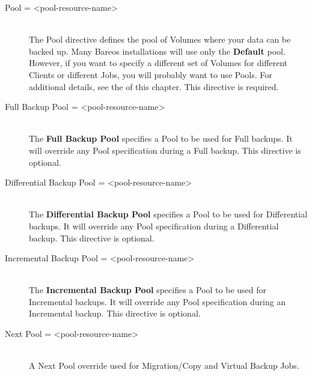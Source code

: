 \begin{description}
\item [Pool = {\textless}pool-resource-name{\textgreater}] \hfill \\
The Pool directive defines the pool of Volumes where your data can be
backed up.  Many Bareos installations will use only the {\bf Default}
pool.  However, if you want to specify a different set of Volumes for
different Clients or different Jobs, you will probably want to use
Pools.  For additional details, see the  of this chapter.  This directive is required.

\item [Full Backup Pool = {\textless}pool-resource-name{\textgreater}] \hfill \\
The {\bf Full Backup Pool} specifies a Pool to be used for Full backups.
It will override any Pool specification during a Full backup.  This
directive is optional.

\item [Differential Backup Pool = {\textless}pool-resource-name{\textgreater}] \hfill \\
The {\bf Differential Backup Pool} specifies a Pool to be used for
Differential backups.  It will override any Pool specification during a
Differential backup.  This directive is optional.

\item [Incremental Backup Pool = {\textless}pool-resource-name{\textgreater}] \hfill \\
The {\bf Incremental Backup Pool} specifies a Pool to be used for
Incremental backups.  It will override any Pool specification during an
Incremental backup.  This directive is optional.

\item [Next Pool = {\textless}pool-resource-name{\textgreater}] \hfill \\
A Next Pool override used for Migration/Copy and Virtual Backup Jobs.


\end{description}
